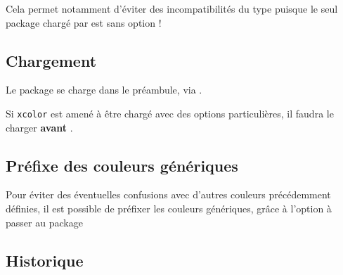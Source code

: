 \documentclass[french,11pt,a4paper]{article}
\begin{document}
\smallskip

Cela permet notamment d'éviter des incompatibilités du type  puisque le seul package chargé par  est  sans option !

\subsection{Chargement}

Le package se charge dans le préambule, via .

Si \texttt{xcolor} est amené à être chargé avec des options particulières, il faudra le charger \textbf{avant} .



\subsection{Préfixe des couleurs génériques}

Pour éviter des éventuelles confusions avec d'autres couleurs précédemment définies, il est possible de préfixer les couleurs génériques, grâce à l'option \MontreCode{[Prefixe]} à passer au package 


\pagebreak

\subsection{Historique}
\end{document}
